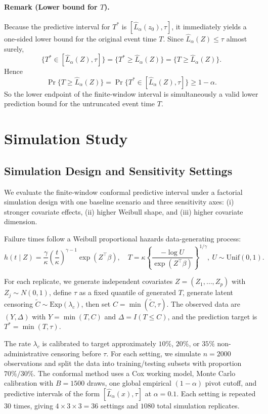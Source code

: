 \documentclass[12pt]{article}
\makeatletter
\let\thesis@chapter\section
\let\thesis@section\subsection
\let\thesis@subsection\subsubsection
\newcommand{\chapter}{\thesis@chapter}
\renewcommand{\section}{\thesis@section}
\renewcommand{\subsection}{\thesis@subsection}
\makeatother
\begin{document}
\paragraph{\textcolor{revisionblue}{Remark (Lower bound for $T$).}}
{\color{revisionblue}
Because the predictive interval for $T^*$ is $[\widehat L_\alpha(z_0),\tau]$, it
immediately yields a one-sided lower bound for the original event time $T$. Since
$\widehat L_\alpha(Z)\le \tau$ almost surely,
\[
\{T^*\in[\widehat L_\alpha(Z),\tau]\}
=\{T^*\ge \widehat L_\alpha(Z)\}
=\{T\ge \widehat L_\alpha(Z)\}.
\]
Hence
\[
\Pr\{T\ge \widehat L_\alpha(Z)\}
=
\Pr\{T^*\in[\widehat L_\alpha(Z),\tau]\}
\ge 1-\alpha.
\]
So the lower endpoint of the finite-window interval is simultaneously a valid lower
prediction bound for the untruncated event time $T$.
}




\chapter{Simulation Study}

\section{Simulation Design and Sensitivity Settings}
We evaluate the finite-window conformal predictive interval under a factorial simulation
 design with one baseline scenario and three sensitivity axes:
(i) stronger covariate effects, (ii) higher Weibull shape, and
(iii) higher covariate dimension.

Failure times follow a Weibull proportional hazards data-generating process:
\[
h(t\mid Z)=\frac{\gamma}{\kappa}\left(\frac{t}{\kappa}\right)^{\gamma-1}\exp(Z^\top\beta),
\quad
T=\kappa\left\{\frac{-\log U}{\exp(Z^\top\beta)}\right\}^{1/\gamma},\ U\sim\mathrm{Unif}(0,1).
\]

For each replicate, we generate independent covariates $Z=(Z_1,\dots,Z_p)$ with
$Z_j\sim N(0,1)$, define $\tau$ as a fixed quantile of generated $T$, generate latent
censoring $\widetilde C\sim\mathrm{Exp}(\lambda_c)$, then set $C=\min(\widetilde C,\tau)$.
The observed data are $(Y,\Delta)$ with $Y=\min(T,C)$ and $\Delta=I(T\le C)$, and the
prediction target is $T^*=\min(T,\tau)$.

The rate $\lambda_c$ is calibrated to target approximately $10\%$, $20\%$, or $35\%$
non-administrative censoring before $\tau$. For each setting, we simulate $n=2000$
observations and split the data into training/testing subsets with proportion $70\%/30\%$.
\textcolor{revisionblue}{The conformal method uses a Cox working model, Monte Carlo calibration with
$B=1500$ draws, one global empirical $(1-\alpha)$ pivot cutoff, and predictive
intervals of the form $[\widehat L_\alpha(x),\tau]$ at $\alpha=0.1$.} Each setting is repeated $30$ times, giving
$4\times 3\times 3=36$ settings and $1080$ total simulation replicates.
\end{document}
